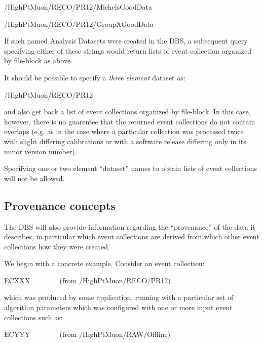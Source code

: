 \documentclass[pdftex]{cmspaper}
\begin{document}
\begin{center}
     \mbox{/HighPtMuon/RECO/PR12/MichelsGoodData}
\end{center}

\begin{center}
     \mbox{/HighPtMuon/RECO/PR12/GroupXGoodData}
\end{center}

If such named Analysis Datasets were created in the DBS, a subsequent query 
specifying either of these strings would return lists of event collection 
organized by file-block as above.

  It should be possible to specify a {\it three element} dataset as:

\begin{center}
     \mbox{/HighPtMuon/RECO/PR12}
\end{center}

and also get back a list of event collections organized by file-block. In
this case, however, there is no guarentee that the returned event collections
do not contain overlaps (e.g. as in the case where a particular collection
was processed twice with slight differing calibrations or with a software
release differing only in its minor version number).

  Specifying one or two element ``dataset'' names to obtain lists of event
collections will not be allowed.

\subsection{Provenance concepts}
\label{sec:prov}

  The DBS will also provide information regarding the ``provenance'' of
the data it describes, in particular which event collections are derived
from which other event collections how they were created.

  We begin with a concrete example. Consider an event collection:

\begin{center}
ECXXX ~~~~~~~ (from /HighPtMuon/RECO/PR12)
\end{center}

which was produced by some application, running with a particular set 
of algorithm parameters which was configured with one or more input event 
collections such as:
 
\begin{center}
ECYYY ~~~~~~~ (from /HighPtMuon/RAW/Offline)
\end{center}
\end{document}
